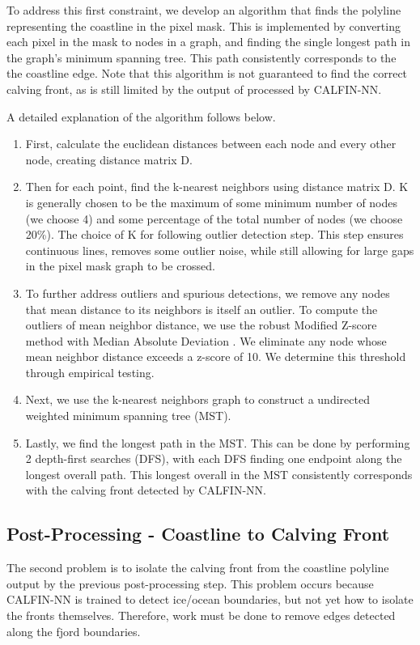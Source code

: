 \documentclass[tc, manuscript]{copernicus}
\begin{document}
To address this first constraint, we develop an algorithm that finds the polyline representing the coastline in the pixel mask. This is implemented by converting each pixel in the mask to nodes in a graph, and finding the single longest path in the graph's minimum spanning tree. This path consistently corresponds to the the coastline edge. Note that this algorithm is not guaranteed to find the correct calving front, as is still limited by the output of processed by CALFIN-NN.

A detailed explanation of the algorithm follows below.


\begin{enumerate}
    \item First, calculate the euclidean distances between each node and every other node, creating distance matrix D.
    \item Then for each point, find the k-nearest neighbors using distance matrix D. K is generally chosen to be the maximum of some minimum number of nodes (we choose 4) and some percentage of the total number of nodes (we choose 20\%). The choice of K for following outlier detection step.  This step ensures continuous lines, removes some outlier noise, while still allowing for large gaps in the pixel mask graph to be crossed.
    \item To further address outliers and spurious detections, we remove any nodes that mean distance to its neighbors is itself an outlier. To compute the outliers of mean neighbor distance, we use the robust Modified Z-score method with Median Absolute Deviation \citep{garcia2012}. We eliminate any node whose mean neighbor distance exceeds a z-score of 10. We determine this threshold through empirical testing. 
    \item Next, we use the k-nearest neighbors graph to construct a undirected weighted minimum spanning tree (MST).
    \item Lastly, we find the longest path in the MST. This can be done by performing 2 depth-first searches (DFS), with each DFS finding one endpoint along the longest overall path. This longest overall in the MST consistently corresponds with the calving front detected by CALFIN-NN.
\end{enumerate}

\subsection{Post-Processing - Coastline to Calving Front}
The second problem is to isolate the calving front from the coastline polyline output by the previous post-processing step. This problem occurs because CALFIN-NN is trained to detect ice/ocean boundaries, but not yet how to isolate the fronts themselves. Therefore, work must be done to remove edges detected along the fjord boundaries.
\end{document}
